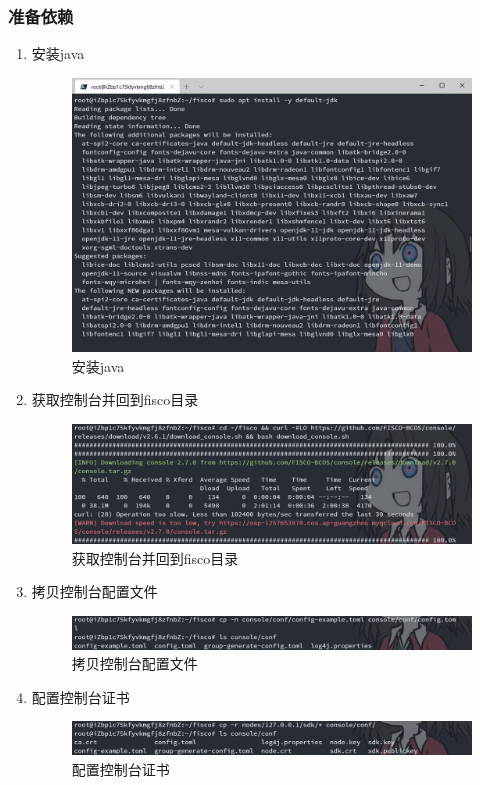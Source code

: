 \documentclass[a4paper, 11pt]{article}
\begin{document}
\subsubsection{准备依赖}
\begin{enumerate}
      \item 安装java
      \begin{figure}[H]
            \centering
            \includegraphics[width = 0.8 \textwidth]{java.png}
            \caption{安装java}
      \end{figure}

      \item 获取控制台并回到fisco目录
      \begin{figure}[H]
            \centering
            \includegraphics[width = 0.8 \textwidth]{console.png}
            \caption{获取控制台并回到fisco目录}
      \end{figure}

      \item 拷贝控制台配置文件
      \begin{figure}[H]
            \centering
            \includegraphics[width = 0.8 \textwidth]{cp.png}
            \caption{拷贝控制台配置文件}
      \end{figure}

      \item 配置控制台证书
      \begin{figure}[H]
            \centering
            \includegraphics[width = 0.8 \textwidth]{sdk.png}
            \caption{配置控制台证书}
      \end{figure}
\end{enumerate}
\end{document}
